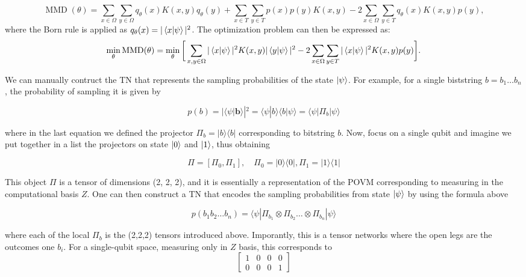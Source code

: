 \begin{equation}
\operatorname{MMD}(\theta) = 
\sum_{x \in \Omega} \sum_{y \in \Omega} q_{\theta}(x) K(x, y) q_{\theta}(y)
+ \sum_{x \in T} \sum_{y \in T} p(x) p(y) K(x, y)
- 2 \sum_{x \in \Omega} \sum_{y \in T} q_\theta(x) K(x, y) p(y),
\end{equation}
where the Born rule is applied as $ q_\theta(x) = |\braket{x | \psi}|^2 $.
The optimization problem can then be expressed as:
\begin{equation}
\min_{\theta} \operatorname{MMD}(\theta) =
\min_{\theta} \bigg[ 
\sum_{x, y \in \Omega} |\braket{x | \psi}|^2 K(x, y) |\braket{y | \psi}|^2
- 2 \sum_{x \in \Omega} \sum_{y \in T} |\braket{x | \psi}|^2 K(x, y) p(y) 
\bigg].
\end{equation}

We can manually contruct the TN that represents the sampling probabilities of the state $\ket{\psi}$. For example, for a single biststring $b = b_1\ldots b_n$, the probability of sampling it is given by

$$p(b) = |\langle\psi|\bm{b}\rangle|^2 = \langle\psi|b\rangle \langle b|\psi\rangle = \langle\psi|\Pi_{b}|\psi\rangle$$

where in the last equation we defined the projector $\Pi_b = |b\rangle\langle b|$ corresponding to bitstring $b$. Now, focus on a single qubit and imagine we put together in a list the projectors on state $\ket{0}$ and $\ket{1}$, thus obtaining

$$\Pi = [\Pi_0, \Pi_1], \quad \Pi_0 = |0\rangle\langle0|, \Pi_1 = |1\rangle\langle1|$$

This object $\Pi$ is a tensor of dimensions (2, 2, 2), and it is essentially a representation of the POVM corresponding to measuring in the computational basis $Z$. One can then construct a TN that encodes the sampling probabilities from state $\ket{\psi}$ by using the formula above 

$$p(b_1b_2\ldots b_n) = \langle\psi|\Pi_{b_1} \otimes \Pi_{b_2} \ldots \otimes \Pi_{b_n}|\psi\rangle$$

where each of the local $\Pi_b$ is the (2,2,2) tensors introduced above. Imporantly, this is a tensor networks where the open legs are the outcomes one $b_i$.
For a single-qubit space, measuring only in $Z$ basis, this corresponds to 
$$
\left[
\begin{array}{cc|cc}
1 & 0 & 0 & 0 \\
0 & 0 & 0 & 1
\end{array}
\right]
$$

